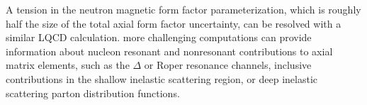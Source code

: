 A tension in the neutron magnetic form factor parameterization, which is roughly half the size of the total axial form factor uncertainty, can be resolved with a similar LQCD calculation.
more challenging computations can provide information about nucleon
resonant and nonresonant contributions to axial matrix elements,
such as the $\Delta$ or Roper resonance channels, 
inclusive contributions in the shallow inelastic scattering region,
or deep inelastic scattering parton distribution functions.

